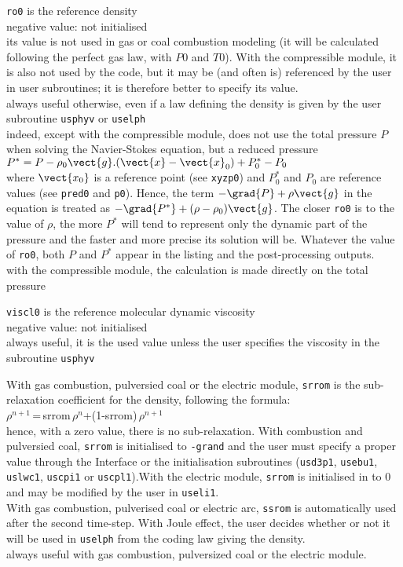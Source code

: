 {{\tt ro0} is the reference density\\
negative value: not initialised\\
its value is not used in gas or coal combustion modeling (it
will be calculated following the perfect gas law, with $P0$ and $T0$). With the
compressible module, it is also not used by the code, but it may be (and often
is) referenced by the user in user subroutines; it is therefore better to
specify its value.\\
always useful otherwise, even if a law defining the density is given by
the user subroutine \texttt{usphyv} or \texttt{uselph}\\
indeed, except with the
compressible module, \CS does not
use the total pressure $P$ when solving the Navier-Stokes equation, but a
reduced pressure \\
$P^*=P-\rho_0\vect{g}.(\vect{x}-\vect{x}_0)+P^*_0-P_0$\\
where
$\vect{x_0}$ is a reference point (see {\tt xyzp0}) and $P^*_0$ and $P_0$ are
reference values (see {\tt pred0} and {\tt p0}). Hence, the term
$-\grad{P}+\rho\vect{g}$ in the equation is treated as
$-\grad{P^*}+(\rho-\rho_0)\vect{g}$. The closer {\tt ro0} is to the value of $\rho$,
the more $P^*$ will tend to represent only the dynamic part of the pressure and
the faster and more precise its solution will be. Whatever the value of {\tt ro0},
both $P$ and $P^*$ appear in the listing and the post-processing outputs.\\
with the compressible module, the calculation is made directly on the total
pressure}

{ {\tt viscl0} is the reference molecular dynamic
viscosity\\
negative value: not initialised\\
always useful, it is the used value unless the user specifies the
viscosity in the subroutine \texttt{usphyv}}

{With gas combustion, pulversied coal or the electric module, {\tt srrom}
 is the sub-relaxation coefficient for the density, following the formula:\\
$\rho^{n+1}$\,=\,srrom\,$\rho^n$+(1-srrom)\,$\rho^{n+1}$\\
hence, with a zero value, there is no sub-relaxation.
With combustion and pulversied coal, {\tt srrom} is initialised to {\tt -grand}
and the user must specify a proper value through the Interface or the
initialisation subroutines (\texttt{usd3p1},
 \texttt{usebu1}, \texttt{uslwc1}, \texttt{uscpi1} or
\texttt{uscpl1}).With the electric module, {\tt srrom} is initialised in to 0
and may be modified by the user in \texttt{useli1}.\\
With gas combustion, pulverised coal or electric arc, {\tt ssrom} is
automatically used after the second time-step. With Joule effect,
the user decides whether or not it will be used in \texttt{uselph}
from the coding law giving the density.}\\
always useful with gas combustion, pulversized coal or the electric module.


